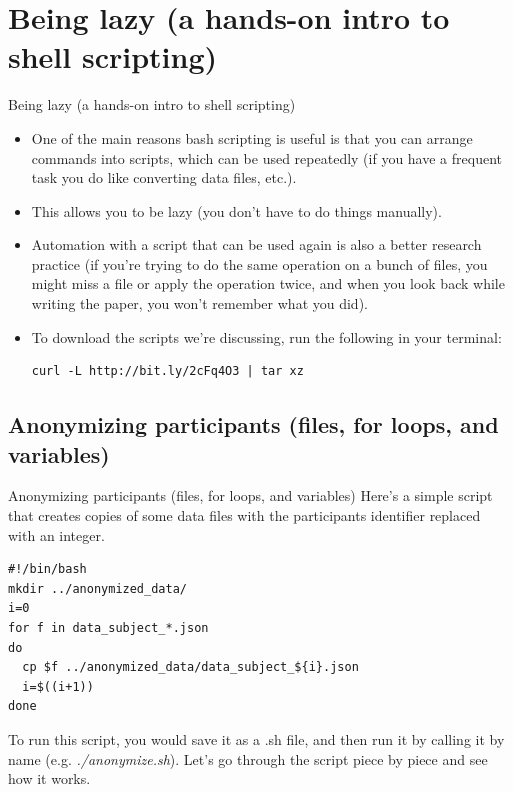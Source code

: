 \documentclass{beamer}
\begin{document}
\section{Being lazy (a hands-on intro to shell scripting)}
\begin{frame}[fragile]{Being lazy (a hands-on intro to shell scripting)}
\begin{itemize}
\item<1-> One of the main reasons bash scripting is useful is that you can arrange commands into scripts, which can be used repeatedly (if you have a frequent task you do like converting data files, etc.). 
\item<2-> This allows you to be lazy (you don't have to do things manually).
\item<3-> Automation with a script that can be used again is also a better research practice (if you're trying to do the same operation on a bunch of files, you might miss a file or apply the operation twice, and when you look back while writing the paper, you won't remember what you did).
\item<4-> To download the scripts we're discussing, run the following in your terminal:  
\begin{lstlisting}
curl -L http://bit.ly/2cFq4O3 | tar xz
\end{lstlisting}
\end{itemize}
\end{frame}


\subsection{Anonymizing participants (files, for loops, and variables)}
\begin{frame}[fragile]{Anonymizing participants (files, for loops, and variables)}
Here's a simple script that creates copies of some data files with the participants identifier replaced with an integer. 
\begin{lstlisting}[title=anonymize.sh]
#!/bin/bash
mkdir ../anonymized_data/
i=0
for f in data_subject_*.json
do
  cp $f ../anonymized_data/data_subject_${i}.json
  i=$((i+1))
done
\end{lstlisting}
To run this script, you would save it as a .sh file, and then run it by calling it by name (e.g. \emph{./anonymize.sh}). Let's go through the script piece by piece and see how it works. 
\end{frame}
\end{document}

